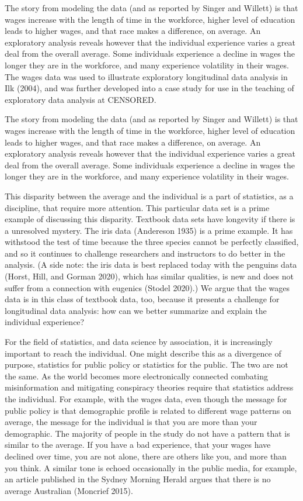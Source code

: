 \documentclass{article}
\begin{document}
The story from modeling the data (and as reported by Singer and Willett) is that wages increase with the length of time in the workforce, higher level of education leads to higher wages, and that race makes a difference, on average. An exploratory analysis reveals however that the individual experience varies a great deal from the overall average. Some individuals experience a decline in wages the longer they are in the workforce, and many experience volatility in their wages. The wages data was used to illustrate exploratory longitudinal data analysis in Ilk (2004), and was further developed into a case study for use in the teaching of exploratory data analysis at CENSORED.

The story from modeling the data (and as reported by Singer and Willett) is that wages increase with the length of time in the workforce, higher level of education leads to higher wages, and that race makes a difference, on average. An exploratory analysis reveals however that the individual experience varies a great deal from the overall average. Some individuals experience a decline in wages the longer they are in the workforce, and many experience volatility in their wages.

This disparity between the average and the individual is a part of statistics, as a discipline, that require more attention. This particular data set is a prime example of discussing this disparity. Textbook data sets have longevity if there is a unresolved mystery. The iris data (Andereson 1935) is a prime example. It has withstood the test of time because the three species cannot be perfectly classified, and so it continues to challenge researchers and instructors to do better in the analysis. (A side note: the iris data is best replaced today with the penguins data (Horst, Hill, and Gorman 2020), which has similar qualities, is new and does not suffer from a connection with eugenics (Stodel 2020).) We argue that the wages data is in this class of textbook data, too, because it presents a challenge for longitudinal data analysis: how can we better summarize and explain the individual experience?

For the field of statistics, and data science by association, it is increasingly important to reach the individual. One might describe this as a divergence of purpose, statistics for public policy or statistics for the public. The two are not the same. As the world becomes more electronically connected combating misinformation and mitigating conspiracy theories require that statistics address the individual. For example, with the wages data, even though the message for public policy is that demographic profile is related to different wage patterns on average, the message for the individual is that you are more than your demographic. The majority of people in the study do not have a pattern that is similar to the average. If you have a bad experience, that your wages have declined over time, you are not alone, there are others like you, and more than you think. A similar tone is echoed occasionally in the public media, for example, an article published in the Sydney Morning Herald argues that there is no average Australian (Moncrief 2015).
\end{document}
